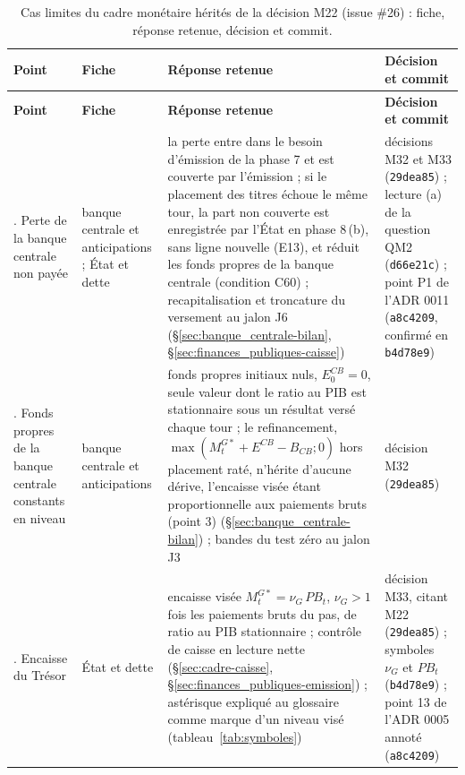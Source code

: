 \documentclass[11pt,a4paper]{article}
\begin{document}
\begin{center}\small
\begin{longtable}{>{\raggedright\arraybackslash}p{2.9cm}>{\raggedright\arraybackslash}p{2.3cm}>{\raggedright\arraybackslash}p{5.8cm}>{\raggedright\arraybackslash}p{3.6cm}}
\caption{Cas limites du cadre monétaire hérités de la décision M22 (issue \#26) : fiche, réponse retenue, décision et commit.}\label{tab:cadre-cas-limites}\\
\toprule
\textbf{Point} & \textbf{Fiche} & \textbf{Réponse retenue} & \textbf{Décision et commit}\\
\midrule
\endfirsthead
\toprule
\textbf{Point} & \textbf{Fiche} & \textbf{Réponse retenue} & \textbf{Décision et commit}\\
\midrule
\endhead
1. Perte de la banque centrale non payée & banque centrale et anticipations ; État et dette & la perte entre dans le besoin d'émission de la phase 7 et est couverte par l'émission ; si le placement des titres échoue le même tour, la part non couverte est enregistrée par l'État en phase 8\,(b), sans ligne nouvelle (E13), et réduit les fonds propres de la banque centrale (condition C60) ; recapitalisation et troncature du versement au jalon J6 (\S\ref{sec:banque_centrale-bilan}, \S\ref{sec:finances_publiques-caisse}) & décisions M32 et M33 (\texttt{29dea85}) ; lecture (a) de la question QM2 (\texttt{d66e21c}) ; point P1 de l'ADR 0011 (\texttt{a8c4209}, confirmé en \texttt{b4d78e9})\\
2. Fonds propres de la banque centrale constants en niveau & banque centrale et anticipations & fonds propres initiaux nuls, $E^{\mathit{CB}}_0 = 0$, seule valeur dont le ratio au PIB est stationnaire sous un résultat versé chaque tour ; le refinancement, $\max(M^{G*}_t + E^{\mathit{CB}} - B_{\mathit{CB}} ; 0)$ hors placement raté, n'hérite d'aucune dérive, l'encaisse visée étant proportionnelle aux paiements bruts (point 3) (\S\ref{sec:banque_centrale-bilan}) ; bandes du test zéro au jalon J3 & décision M32 (\texttt{29dea85})\\
3. Encaisse du Trésor & État et dette & encaisse visée $M^{G*}_t = \nu_G\,\mathit{PB}_t$, $\nu_G > 1$ fois les paiements bruts du pas, de ratio au PIB stationnaire ; contrôle de caisse en lecture nette (\S\ref{sec:cadre-caisse}, \S\ref{sec:finances_publiques-emission}) ; astérisque expliqué au glossaire comme marque d'un niveau visé (tableau~\ref{tab:symboles}) & décision M33, citant M22 (\texttt{29dea85}) ; symboles $\nu_G$ et $\mathit{PB}_t$ (\texttt{b4d78e9}) ; point 13 de l'ADR 0005 annoté (\texttt{a8c4209})\\

\end{longtable}
\end{center}
\end{document}
